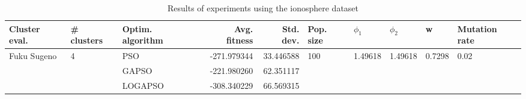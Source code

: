 \begin{table}
\centering
\caption{Results of experiments using the ionosphere dataset}
\begin{tabular}{lllrrlllll}
\toprule
               Cluster eval. &        \# clusters & Optim. algorithm &  Avg. fitness &  Std. dev. &            Pop. size &               $\phi_{1}$ &               $\phi_{2}$ &                       w &         Mutation rate \\
\midrule
\multirow{3}{*}{Fuku Sugeno} & \multirow{3}{*}{4} &              PSO &   -271.979344 &  33.446588 & \multirow{3}{*}{100} & \multirow{3}{*}{1.49618} & \multirow{3}{*}{1.49618} & \multirow{3}{*}{0.7298} & \multirow{3}{*}{0.02} \\
                             &                    &            GAPSO &   -221.980260 &  62.351117 &                      &                          &                          &                         &                       \\
                             &                    &          LOGAPSO &   -308.340229 &  66.569315 &                      &                          &                          &                         &                       \\
\bottomrule
\end{tabular}
\end{table}
